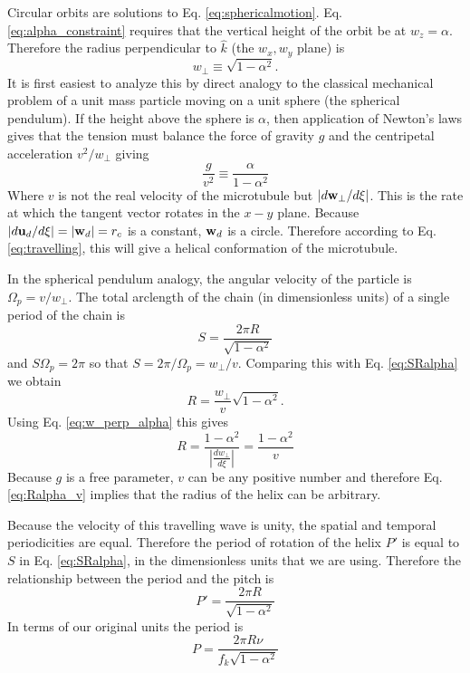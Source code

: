 \documentclass[11pt]{ucthesis}
\def\bu{{\bf u}}
\def\bw{{\bf w}}
\begin{document}
Circular orbits are solutions to Eq. \ref{eq:sphericalmotion}. Eq. \ref{eq:alpha_constraint} requires that the vertical
height of the orbit be at $w_z = \alpha$. Therefore the radius perpendicular to $\hat k$ (the $w_x, w_y$ plane) is 
\begin{equation}
\label{eq:w_perp_alpha}
w_\perp \equiv \sqrt{1-\alpha^2}. 
\end{equation}
It is first easiest to analyze this by direct analogy to the classical mechanical problem of a unit mass particle moving on a unit sphere (the
spherical pendulum).
If the height above the sphere is $\alpha$, then application of Newton's laws gives that the tension must balance the force
of gravity $g$ and the centripetal acceleration $v^2/w_\perp$ giving
\begin{equation}
\frac{g}{v^2} \equiv \frac{\alpha}{1-\alpha^2} 
\end{equation}
Where $v$ is not the real velocity of the microtubule but $|d \bw_\perp/d\xi|$. This is the rate at which the
tangent vector rotates in the $x-y$ plane. 
Because $|d\bu_d/d\xi|  = |\bw_d| = r_c$ is a constant, $\bw_d$ is a circle. 
Therefore according to Eq. \ref{eq:travelling}, this will give a helical conformation of the microtubule. 


In the spherical pendulum analogy, the angular velocity of the particle
is $\Omega_p = v/w_\perp$. The total arclength of the chain (in dimensionless units) of a single period of
the chain is
\begin{equation}
\label{eq:SRalpha}
S = \frac{2\pi R}{\sqrt{1-\alpha^2}}
\end{equation}
and $S \Omega_p = 2 \pi$ so that $S = 2\pi/\Omega_p = w_\perp/v$. Comparing this with Eq. \ref{eq:SRalpha}
we obtain 
\begin{equation}
R = \frac{w_\perp}{v} \sqrt{1-\alpha^2}. 
\end{equation}
Using Eq. \ref{eq:w_perp_alpha} this gives 
\begin{equation}
\label{eq:Ralpha_v}
R = \frac{1-\alpha^2}{|\frac{d w_\perp}{d \xi}|} = \frac{1-\alpha^2}{v}
\end{equation}
Because $g$ is a free parameter, $v$ can be any positive number and therefore Eq. \ref{eq:Ralpha_v}
implies that the radius of the helix can be arbitrary. 

Because the velocity of this travelling wave is unity, the spatial and temporal periodicities are equal. 
Therefore the period of rotation of the helix $P'$ is equal to  $S$ in Eq. \ref{eq:SRalpha}, in the dimensionless units that we are using.
Therefore the relationship between the period and the pitch is
\begin{equation}
\label{eq:Pdimensionless}
P' = \frac{2\pi R}{\sqrt{1-\alpha^2}}
\end{equation}
In terms of our original units the period is
\begin{equation}
\label{eq:T_circle}
P = \frac{2\pi R \nu}{f_k \sqrt{1-\alpha^2}}
\end{equation}
\end{document}
